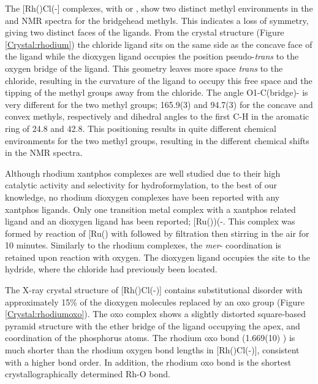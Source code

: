 The [Rh(\tBuxantphos)Cl(-] complexes, with \tBusixantphos{} or \tBuxantphos{}, show two distinct methyl environments in the \proton{} and \carbon{} NMR spectra for the bridgehead methyls.  This indicates a loss of symmetry, giving two distinct faces of the \tBuxantphos{} ligands.  From the crystal structure (Figure \ref{Crystal:rhodium}) the chloride ligand sits on the same side as the concave face of the ligand while the dioxygen ligand occupies the position pseudo-\emph{trans} to the oxygen bridge of the ligand.  This geometry leaves more space \emph{trans} to the chloride, resulting in the curvature of the ligand to occupy this free space and the tipping of the methyl groups away from the chloride.  The angle O1-C(bridge)- is very different for the two methyl groups; 165.9(3) and 94.7(3)\degrees{} for the concave and convex methyls, respectively and dihedral angles to the first C-H in the aromatic ring of 24.8 and 42.8\degrees.  This positioning results in quite different chemical environments for the two methyl groups, resulting in the different chemical shifts in the NMR spectra.  

Although rhodium xantphos{} complexes are well studied due to their high catalytic activity and selectivity for hydroformylation, to the best of our knowledge, no rhodium dioxygen complexes have been reported with any xantphos ligands.  Only one transition metal complex with a xantphos related ligand and an  dioxygen ligand has been reported; [Ru(\Phxantphos))(-\ce{O2)H]BAr4^F}.\cite{Ledger2010}  This complex was formed by reaction of [Ru(\Phxantphos)\ce{(PPh3)HCl]} with  followed by filtration then stirring in the air for 10 minutes.  Similarly to the rhodium \tBuxantphos{} complexes, the \emph{mer}-\POP{} coordination is retained upon reaction with oxygen.  The dioxygen ligand occupies the site \trans{} to the hydride, where the chloride had previously been located.  

The X-ray crystal structure of [Rh(\tBuxantphos)Cl(-)] contains substitutional disorder with approximately 15\%{} of the dioxygen molecules replaced by an oxo group (Figure \ref{Crystal:rhodiumoxo}).  The oxo complex shows a slightly distorted square-based pyramid structure with the ether bridge of the \tBuxantphos{} ligand occupying the apex, and \trans{} coordination of the phosphorus atoms.  The rhodium oxo bond (1.669(10) \A) is much shorter than the rhodium oxygen bond lengths in [Rh(\tBuxantphos)Cl(-)], consistent with a higher bond order.  In addition, the rhodium oxo bond is the shortest crystallographically determined Rh-O bond.  

